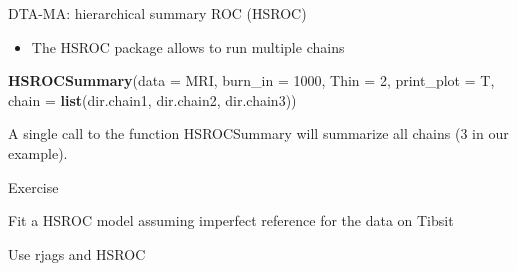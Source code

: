 \documentclass[
  ignorenonframetext,
  aspectratio=43,
]{beamer}
\newenvironment{Shaded}{\begin{snugshade}}{\end{snugshade}}
\newcommand{\DataTypeTok}[1]{\textcolor[rgb]{0.13,0.29,0.53}{#1}}
\newcommand{\DecValTok}[1]{\textcolor[rgb]{0.00,0.00,0.81}{#1}}
\newcommand{\KeywordTok}[1]{\textcolor[rgb]{0.13,0.29,0.53}{\textbf{#1}}}
\newcommand{\NormalTok}[1]{#1}
\providecommand{\tightlist}{%
  \setlength{\itemsep}{0pt}\setlength{\parskip}{0pt}}
\begin{document}
\begin{frame}[fragile]{DTA-MA: hierarchical summary ROC (HSROC)}
\protect\hypertarget{dta-ma-hierarchical-summary-roc-hsroc-2}{}

\begin{itemize}
\tightlist
\item
  The HSROC package allows to run multiple chains
\end{itemize}

\begin{Shaded}
\begin{Highlighting}[]
\KeywordTok{HSROCSummary}\NormalTok{(}\DataTypeTok{data =}\NormalTok{ MRI,}
             \DataTypeTok{burn_in =} \DecValTok{1000}\NormalTok{,}
             \DataTypeTok{Thin =} \DecValTok{2}\NormalTok{,}
             \DataTypeTok{print_plot =}\NormalTok{ T, }
             \DataTypeTok{chain =} \KeywordTok{list}\NormalTok{(dir.chain1, dir.chain2, dir.chain3))}
\end{Highlighting}
\end{Shaded}

A single call to the function HSROCSummary will summarize all chains (3
in our example).

\end{frame}

\begin{frame}{Exercise}
\protect\hypertarget{exercise}{}

Fit a HSROC model assuming imperfect reference for the data on Tibsit

Use rjags and HSROC

\end{frame}
\end{document}
